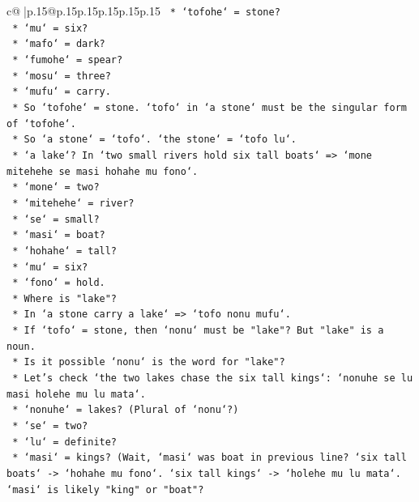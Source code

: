 \documentclass{article}
\begin{document}
{\begin{supertabular}{c@{$\;$}|p{.15\linewidth}@{}p{.15\linewidth}p{.15\linewidth}p{.15\linewidth}p{.15\linewidth}p{.15\linewidth}}
{{{\texttt{                *   `tofohe` = stone?} \\
\texttt{                *   `mu` = six?} \\
\texttt{                *   `mafo` = dark?} \\
\texttt{                *   `fumohe` = spear?} \\
\texttt{                *   `mosu` = three?} \\
\texttt{                *   `mufu` = carry.} \\
\texttt{            *   So `tofohe` = stone. `tofo` in `a stone` must be the singular form of `tofohe`.} \\
\texttt{            *   So `a stone` = `tofo`. `the stone` = `tofo lu`.} \\
\texttt{            *   `a lake`? In `two small rivers hold six tall boats` => `mone mitehehe se masi hohahe mu fono`.} \\
\texttt{                *   `mone` = two?} \\
\texttt{                *   `mitehehe` = river?} \\
\texttt{                *   `se` = small?} \\
\texttt{                *   `masi` = boat?} \\
\texttt{                *   `hohahe` = tall?} \\
\texttt{                *   `mu` = six?} \\
\texttt{                *   `fono` = hold.} \\
\texttt{            *   Where is "lake"?} \\
\texttt{            *   In `a stone carry a lake` => `tofo nonu mufu`.} \\
\texttt{            *   If `tofo` = stone, then `nonu` must be "lake"? But "lake" is a noun.} \\
\texttt{            *   Is it possible `nonu` is the word for "lake"?} \\
\texttt{            *   Let's check `the two lakes chase the six tall kings`: `nonuhe se lu masi holehe mu lu mata`.} \\
\texttt{                *   `nonuhe` = lakes? (Plural of `nonu`?)} \\
\texttt{                *   `se` = two?} \\
\texttt{                *   `lu` = definite?} \\
\texttt{                *   `masi` = kings? (Wait, `masi` was boat in previous line? `six tall boats` {-}> `hohahe mu fono`. `six tall kings` {-}> `holehe mu lu mata`. `masi` is likely "king" or "boat"?} \\
}}}
\end{supertabular}}
\end{document}
